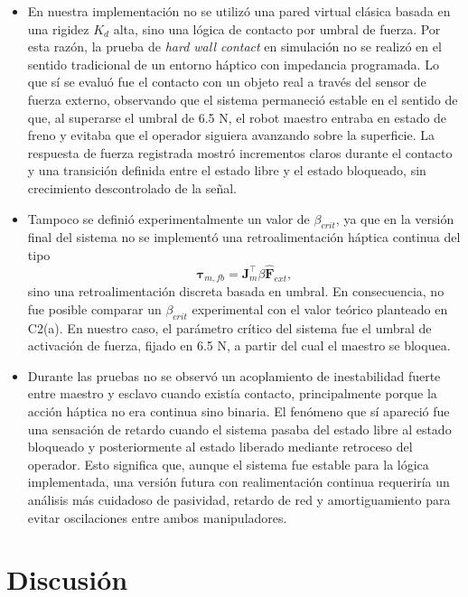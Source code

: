 \documentclass[journal,10pt,twoside]{IEEEtran}
\begin{document}
\begin{itemize}
  \item En nuestra implementación no se utilizó una pared virtual clásica basada en una rigidez \(K_d\) alta, sino una lógica de contacto por umbral de fuerza. Por esta razón, la prueba de \textit{hard wall contact} en simulación no se realizó en el sentido tradicional de un entorno háptico con impedancia programada. Lo que sí se evaluó fue el contacto con un objeto real a través del sensor de fuerza externo, observando que el sistema permaneció estable en el sentido de que, al superarse el umbral de 6.5 N, el robot maestro entraba en estado de freno y evitaba que el operador siguiera avanzando sobre la superficie. La respuesta de fuerza registrada mostró incrementos claros durante el contacto y una transición definida entre el estado libre y el estado bloqueado, sin crecimiento descontrolado de la señal.
  \\

  \item Tampoco se definió experimentalmente un valor de \(\beta_{crit}\), ya que en la versión final del sistema no se implementó una retroalimentación háptica continua del tipo
    \[
    \bm{\tau}_{m,fb}=\bm{J}_m^\top \beta \hat{\bm{F}}_{ext},
    \]
    sino una retroalimentación discreta basada en umbral. En consecuencia, no fue posible comparar un \(\beta_{crit}\) experimental con el valor teórico planteado en C2(a). En nuestro caso, el parámetro crítico del sistema fue el umbral de activación de fuerza, fijado en 6.5 N, a partir del cual el maestro se bloquea.
  \\

  \item Durante las pruebas no se observó un acoplamiento de inestabilidad fuerte entre maestro y esclavo cuando existía contacto, principalmente porque la acción háptica no era continua sino binaria. El fenómeno que sí apareció fue una sensación de retardo cuando el sistema pasaba del estado libre al estado bloqueado y posteriormente al estado liberado mediante retroceso del operador. Esto significa que, aunque el sistema fue estable para la lógica implementada, una versión futura con realimentación continua requeriría un análisis más cuidadoso de pasividad, retardo de red y amortiguamiento para evitar oscilaciones entre ambos manipuladores.
\end{itemize}

\section{Discusión}
\label{sec:discussion}
\end{document}
